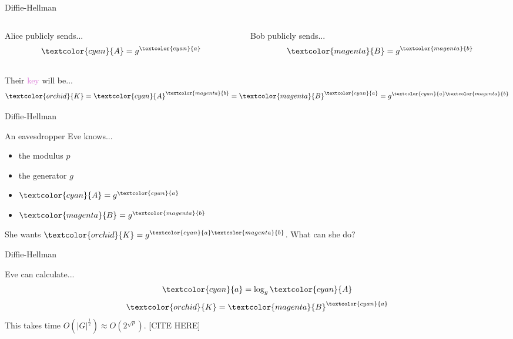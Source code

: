 \documentclass[presentation, aspectratio=54]{beamer}
\newcommand{\cyan}[1]{\textcolor{cyan}{#1}}
\newcommand{\magenta}[1]{\textcolor{magenta}{#1}}
\newcommand{\purple}[1]{\textcolor{orchid}{#1}}
\begin{document}
\begin{frame}{Diffie-Hellman}

\begin{columns}
\begin{column}{0.5\textwidth}
Alice publicly sends...
\[\cyan{A} = g^{\cyan{a}}\]
\end{column}
\begin{column}{0.5\textwidth}
Bob publicly sends...
\[\magenta{B} = g^{\magenta{b}}\]
\end{column}
\end{columns}
\vspace{20pt}
Their \purple{key} will be...
\[\purple{K}
        = \cyan{A}^{\magenta{b}}
        = \magenta{B}^{\cyan{a}}
        = g^{\cyan{a}\magenta{b}}\]

\end{frame}


\begin{frame}{Diffie-Hellman}

An eavesdropper Eve knows...
\begin{itemize}
\item the modulus $p$
\item the generator $g$
\item $\cyan{A} = g^{\cyan{a}}$
\item $\magenta{B} = g^{\magenta{b}}$
\end{itemize}
She wants $\purple{K} = g^{\cyan{a}\magenta{b}}$. What can she do?

\end{frame}


\begin{frame}{Diffie-Hellman}

Eve can calculate...
\[\cyan{a} = \log_g \cyan{A}\]
\[\purple{K} = \magenta{B}^{\cyan{a}}\]
This takes time $O(|G|^{\frac{1}{2}}) \approx O(2^{\sqrt{p}})$. [CITE HERE]

\end{frame}
\end{document}
